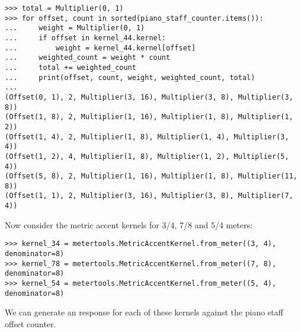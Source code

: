 \begin{singlespacing}
\vspace{-0.5\baselineskip}
\begin{lstlisting}
>>> total = Multiplier(0, 1)
>>> for offset, count in sorted(piano_staff_counter.items()):
...     weight = Multiplier(0, 1)
...     if offset in kernel_44.kernel:
...         weight = kernel_44.kernel[offset]
...     weighted_count = weight * count
...     total += weighted_count
...     print(offset, count, weight, weighted_count, total)
...
(Offset(0, 1), 2, Multiplier(3, 16), Multiplier(3, 8), Multiplier(3, 8))
(Offset(1, 8), 2, Multiplier(1, 16), Multiplier(1, 8), Multiplier(1, 2))
(Offset(1, 4), 2, Multiplier(1, 8), Multiplier(1, 4), Multiplier(3, 4))
(Offset(1, 2), 4, Multiplier(1, 8), Multiplier(1, 2), Multiplier(5, 4))
(Offset(5, 8), 2, Multiplier(1, 16), Multiplier(1, 8), Multiplier(11, 8))
(Offset(1, 1), 2, Multiplier(3, 16), Multiplier(3, 8), Multiplier(7, 4))
\end{lstlisting}
\end{singlespacing}

\noindent Now consider the metric accent kernels for 3/4, 7/8 and 5/4 meters:

\begin{comment}
<abjad>
kernel_34 = metertools.MetricAccentKernel.from_meter((3, 4), denominator=8)
kernel_78 = metertools.MetricAccentKernel.from_meter((7, 8), denominator=8)
kernel_54 = metertools.MetricAccentKernel.from_meter((5, 4), denominator=8)
</abjad>
\end{comment}

\begin{singlespacing}
\vspace{-0.5\baselineskip}
\begin{lstlisting}
>>> kernel_34 = metertools.MetricAccentKernel.from_meter((3, 4), denominator=8)
>>> kernel_78 = metertools.MetricAccentKernel.from_meter((7, 8), denominator=8)
>>> kernel_54 = metertools.MetricAccentKernel.from_meter((5, 4), denominator=8)
\end{lstlisting}
\end{singlespacing}

\noindent We can generate an response for each of these kernels against the
piano staff offset counter.

\begin{comment}
<abjad>
float(kernel_34(piano_staff_counter))
float(kernel_78(piano_staff_counter))
float(kernel_54(piano_staff_counter))
</abjad>
\end{comment}

